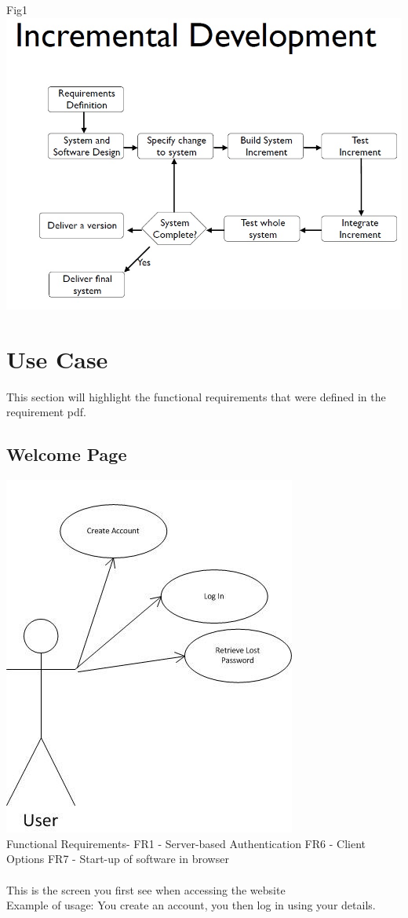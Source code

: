 \documentclass{project}
\begin{document}
Fig1
\includegraphics[scale=0.5]{incremental.jpg}\\

\newpage
\section{Use Case}
This section will highlight the functional requirements that were defined in the
requirement pdf.

\subsection{Welcome Page}
\includegraphics[scale=0.6]{WelcomePageUseCase.jpg}
\\
Functional Requirements-
FR1 - Server-based Authentication
FR6 - Client Options
FR7 - Start-up of software in browser
\\
\\
This is the screen you first see when accessing the website
\\
Example of usage: You create an account, you then log in using your details.
\end{document}
